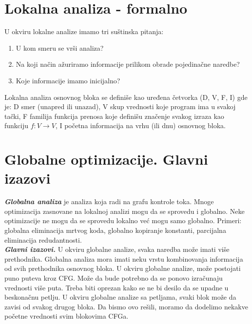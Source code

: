 \documentclass[10pt]{extarticle}
\begin{document}
\section{Lokalna analiza - formalno}
\noindent
U okviru lokalne analize imamo tri suštinska pitanja:
\begin{enumerate}
    \item U kom smeru se vrši analiza?
    \item Na koji način ažuriramo informacije prilikom obrade pojedinačne naredbe?
    \item Koje informacije imamo inicijalno?
\end{enumerate}
Lokalna analiza osnovnog bloka se definiše kao uređena četvorka (D, V, F, I) gde je: D smer (unapred ili unazad), V skup vrednosti koje program ima u svakoj tački, F familija funkcija prenosa koje definišu značenje svakog izraza kao funkciju $f : V \rightarrow V$, I početna informacija na vrhu (ili dnu) osnovnog bloka.

\section{Globalne optimizacije. Glavni izazovi}
\noindent
\textit{\textbf{Globalna analiza}} je analiza koja radi na grafu kontrole toka. Mnoge optimizacija zasnovane na lokalnoj analizi mogu da se sprovedu i globalno. Neke optimizacije ne mogu da se sprovedu lokalno već mogu samo globalno. Primeri: globalna eliminacija mrtvog koda, globalno kopiranje konstanti, parcijalna eliminacija redudantnosti. \\
\textit{\textbf{Glavni izazovi.}} U okviru globalne analize, svaka naredba može imati više prethodnika. Globalna analiza mora imati neku vrstu kombinovanja informacija od svih prethodnika osnovnog bloka. U okviru globalne analize, može postojati puno puteva kroz CFG. Može da bude potrebno da se ponovo izračunaju vrednosti više puta. Treba biti oprezan kako se ne bi desilo da se upadne u beskonačnu petlju. U okviru globalne analize sa petljama, svaki blok može da zavisi od svakog drugog bloka. Da bismo ovo rešili, moramo da dodelimo nekakve početne vrednosti svim blokovima CFGa.
\end{document}
